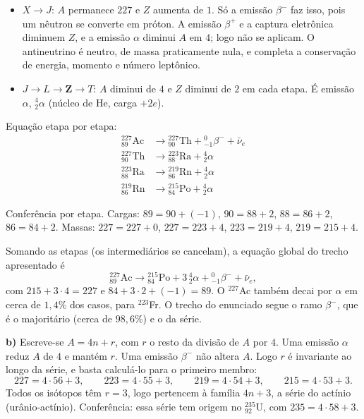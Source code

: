 \documentclass{article}%
\begin{document}
\begin{itemize}
\item $X\to J$: $A$ permanece $227$ e $Z$ aumenta de $1$. Só a emissão $\beta^-$ faz isso, pois um nêutron se converte em próton. A emissão $\beta^+$ e a captura eletrônica diminuem $Z$, e a emissão $\alpha$ diminui $A$ em $4$; logo não se aplicam. O antineutrino é neutro, de massa praticamente nula, e completa a conservação de energia, momento e número leptônico.
\item $J\to L\to\mathbf{Z}\to T$: $A$ diminui de $4$ e $Z$ diminui de $2$ em cada etapa. É emissão $\alpha$, ${}^{4}_{2}\alpha$ (núcleo de He, carga $+2e$).
\end{itemize}

Equação etapa por etapa:
\begin{align*}
{}^{227}_{89}\mathrm{Ac} &\longrightarrow {}^{227}_{90}\mathrm{Th} + {}^{0}_{-1}\beta^- + \bar{\nu}_e\\
{}^{227}_{90}\mathrm{Th} &\longrightarrow {}^{223}_{88}\mathrm{Ra} + {}^{4}_{2}\alpha\\
{}^{223}_{88}\mathrm{Ra} &\longrightarrow {}^{219}_{86}\mathrm{Rn} + {}^{4}_{2}\alpha\\
{}^{219}_{86}\mathrm{Rn} &\longrightarrow {}^{215}_{84}\mathrm{Po} + {}^{4}_{2}\alpha
\end{align*}

Conferência por etapa. Cargas: $89=90+(-1)$, $90=88+2$, $88=86+2$, $86=84+2$. Massas: $227=227+0$, $227=223+4$, $223=219+4$, $219=215+4$.

Somando as etapas (os intermediários se cancelam), a equação global do trecho apresentado é
\[
{}^{227}_{89}\mathrm{Ac}\longrightarrow {}^{215}_{84}\mathrm{Po}+3\,{}^{4}_{2}\alpha+{}^{0}_{-1}\beta^-+\bar{\nu}_e,
\]
com $215+3\cdot 4=227$ e $84+3\cdot 2+(-1)=89$. O $^{227}$Ac também decai por $\alpha$ em cerca de $1{,}4\%$ dos casos, para $^{223}$Fr. O trecho do enunciado segue o ramo $\beta^-$, que é o majoritário (cerca de $98{,}6\%$) e o da série.

\textbf{b)} Escreve-se $A=4n+r$, com $r$ o resto da divisão de $A$ por $4$. Uma emissão $\alpha$ reduz $A$ de $4$ e mantém $r$. Uma emissão $\beta^-$ não altera $A$. Logo $r$ é invariante ao longo da série, e basta calculá-lo para o primeiro membro:
\[
227=4\cdot 56+3,\qquad 223=4\cdot 55+3,\qquad 219=4\cdot 54+3,\qquad 215=4\cdot 53+3.
\]
Todos os isótopos têm $r=3$, logo pertencem à família $4n+3$, a série do actínio (urânio-actínio). Conferência: essa série tem origem no ${}^{235}_{92}\mathrm{U}$, com $235=4\cdot 58+3$.
\end{document}
